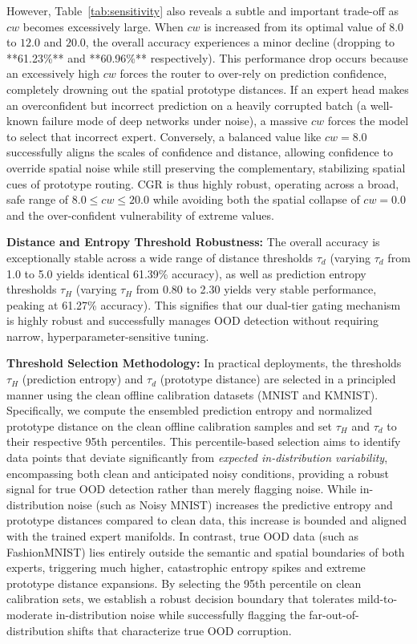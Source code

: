 \documentclass{article}
\theoremstyle{plain}
\theoremstyle{definition}
\theoremstyle{remark}
\begin{document}
However, Table~\ref{tab:sensitivity} also reveals a subtle and important trade-off as $cw$ becomes excessively large. When $cw$ is increased from its optimal value of $8.0$ to $12.0$ and $20.0$, the overall accuracy experiences a minor decline (dropping to **61.23\%** and **60.96\%** respectively). This performance drop occurs because an excessively high $cw$ forces the router to over-rely on prediction confidence, completely drowning out the spatial prototype distances. If an expert head makes an overconfident but incorrect prediction on a heavily corrupted batch (a well-known failure mode of deep networks under noise), a massive $cw$ forces the model to select that incorrect expert. Conversely, a balanced value like $cw=8.0$ successfully aligns the scales of confidence and distance, allowing confidence to override spatial noise while still preserving the complementary, stabilizing spatial cues of prototype routing. CGR is thus highly robust, operating across a broad, safe range of $8.0 \le cw \le 20.0$ while avoiding both the spatial collapse of $cw=0.0$ and the over-confident vulnerability of extreme values.

\textbf{Distance and Entropy Threshold Robustness:} The overall accuracy is exceptionally stable across a wide range of distance thresholds $\tau_d$ (varying $\tau_d$ from 1.0 to 5.0 yields identical 61.39\% accuracy), as well as prediction entropy thresholds $\tau_H$ (varying $\tau_H$ from 0.80 to 2.30 yields very stable performance, peaking at 61.27\% accuracy). This signifies that our dual-tier gating mechanism is highly robust and successfully manages OOD detection without requiring narrow, hyperparameter-sensitive tuning.

\textbf{Threshold Selection Methodology:} In practical deployments, the thresholds $\tau_H$ (prediction entropy) and $\tau_d$ (prototype distance) are selected in a principled manner using the clean offline calibration datasets (MNIST and KMNIST). Specifically, we compute the ensembled prediction entropy and normalized prototype distance on the clean offline calibration samples and set $\tau_H$ and $\tau_d$ to their respective 95th percentiles. This percentile-based selection aims to identify data points that deviate significantly from \textit{expected in-distribution variability}, encompassing both clean and anticipated noisy conditions, providing a robust signal for true OOD detection rather than merely flagging noise. While in-distribution noise (such as Noisy MNIST) increases the predictive entropy and prototype distances compared to clean data, this increase is bounded and aligned with the trained expert manifolds. In contrast, true OOD data (such as FashionMNIST) lies entirely outside the semantic and spatial boundaries of both experts, triggering much higher, catastrophic entropy spikes and extreme prototype distance expansions. By selecting the 95th percentile on clean calibration sets, we establish a robust decision boundary that tolerates mild-to-moderate in-distribution noise while successfully flagging the far-out-of-distribution shifts that characterize true OOD corruption.
\end{document}
